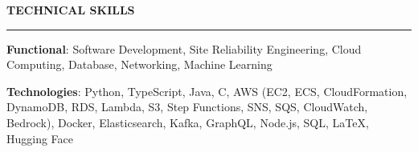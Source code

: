 \documentclass{cv}
\begin{document}

\sectionskip


\textbf{\uppercase{Technical Skills}}
\sectionlineskip
\hrule height 0.6pt
\begin{list}{}{\setlength{\leftmargin}{0pt}}
\itemsep -4.0pt
\item
    \textbf{Functional}: Software Development, Site Reliability Engineering, Cloud Computing, Database, Networking, Machine Learning
\item
    \textbf{Technologies}: Python, TypeScript, Java, C, AWS (EC2, ECS, CloudFormation, DynamoDB, RDS, Lambda, S3, Step Functions, SNS, SQS, CloudWatch, Bedrock), Docker, Elasticsearch, Kafka, GraphQL, Node.js, SQL, \LaTeX, Hugging Face
\end{list}


\sectionskip

\end{document}
